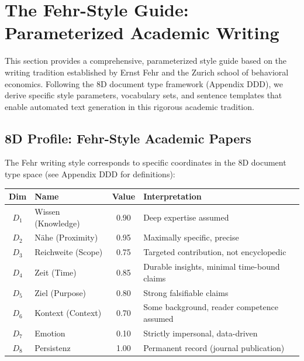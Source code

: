 
\section{The Fehr-Style Guide: Parameterized Academic Writing}
\label{sec:fehr-style-guide}

This section provides a comprehensive, parameterized style guide based on the
writing tradition established by Ernst Fehr and the Zurich school of behavioral
economics. Following the 8D document type framework (Appendix DDD), we derive
specific style parameters, vocabulary sets, and sentence templates that enable
automated text generation in this rigorous academic tradition.

\subsection{8D Profile: Fehr-Style Academic Papers}

The Fehr writing style corresponds to specific coordinates in the 8D document
type space (see Appendix DDD for definitions):

\begin{center}
\renewcommand{\arraystretch}{1.3}
\begin{tabular}{clcl}
\toprule
\textbf{Dim} & \textbf{Name} & \textbf{Value} & \textbf{Interpretation} \\
\midrule
$D_1$ & Wissen (Knowledge) & 0.90 & Deep expertise assumed \\
$D_2$ & Nähe (Proximity) & 0.95 & Maximally specific, precise \\
$D_3$ & Reichweite (Scope) & 0.75 & Targeted contribution, not encyclopedic \\
$D_4$ & Zeit (Time) & 0.85 & Durable insights, minimal time-bound claims \\
$D_5$ & Ziel (Purpose) & 0.80 & Strong falsifiable claims \\
$D_6$ & Kontext (Context) & 0.70 & Some background, reader competence assumed \\
$D_7$ & Emotion & 0.10 & Strictly impersonal, data-driven \\
$D_8$ & Persistenz & 1.00 & Permanent record (journal publication) \\
\bottomrule
\end{tabular}
\end{center}

